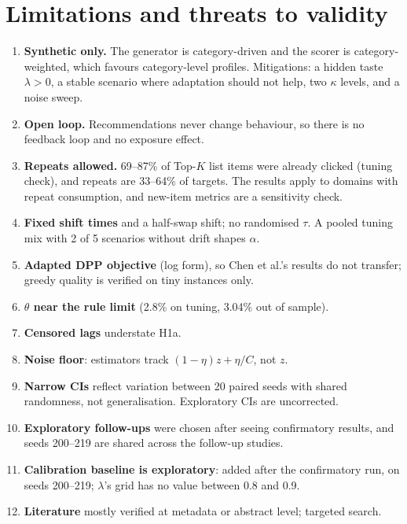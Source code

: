 \documentclass[11pt,a4paper]{article}
\begin{document}
\section{Limitations and threats to validity}\label{sec:limits}
\begin{enumerate}
  \item \textbf{Synthetic only.} The generator is category-driven and the scorer is
        category-weighted, which favours category-level profiles. Mitigations: a hidden taste
        $\lambda>0$, a stable scenario where adaptation should not help, two $\kappa$ levels,
        and a noise sweep.
  \item \textbf{Open loop.} Recommendations never change behaviour, so there is no feedback
        loop and no exposure effect.
  \item \textbf{Repeats allowed.} 69--87\% of Top-$K$ list items were already clicked (tuning
        check), and repeats are 33--64\% of targets. The results apply to domains with repeat
        consumption, and new-item metrics are a sensitivity check.
  \item \textbf{Fixed shift times} and a half-swap shift; no randomised $\tau$. A pooled
        tuning mix with 2 of 5 scenarios without drift shapes $\alpha$.
  \item \textbf{Adapted DPP objective} (log form), so Chen et al.'s results do not transfer;
        greedy quality is verified on tiny instances only.
  \item \textbf{$\theta$ near the rule limit} (2.8\% on tuning, 3.04\% out of sample).
  \item \textbf{Censored lags} understate H1a.
  \item \textbf{Noise floor}: estimators track $(1-\eta)z+\eta/C$, not $z$.
  \item \textbf{Narrow CIs} reflect variation between 20 paired seeds with shared randomness,
        not generalisation. Exploratory CIs are uncorrected.
  \item \textbf{Exploratory follow-ups} were chosen after seeing confirmatory results, and seeds
        200--219 are shared across the follow-up studies.
  \item \textbf{Calibration baseline is exploratory}: added after the confirmatory run, on seeds
        200--219; $\lambda$'s grid has no value between 0.8 and 0.9.
  \item \textbf{Literature} mostly verified at metadata or abstract level; targeted search.
\end{enumerate}
\end{document}
